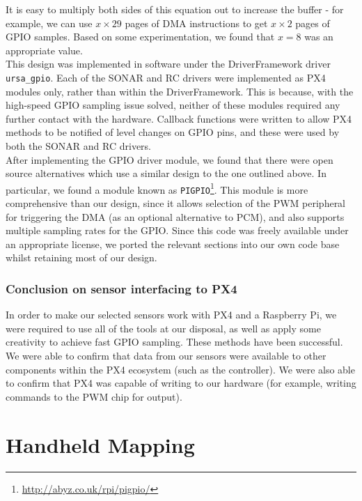 \documentclass[capstone_report.tex]{subfiles}
\begin{document}
    It is easy to multiply both sides of this equation out to increase the buffer - for example, we can use $x \times 29$ pages of DMA instructions to get $x \times 2$ pages of GPIO samples. Based on some experimentation, we found that $x=8$ was an appropriate value.\\

    This design was implemented in software under the DriverFramework driver \texttt{ursa\_gpio}. Each of the SONAR and RC drivers were implemented as PX4 modules only, rather than within the DriverFramework. This is because, with the high-speed GPIO sampling issue solved, neither of these modules required any further contact with the hardware. Callback functions were written to allow PX4 methods to be notified of level changes on GPIO pins, and these were used by both the SONAR and RC drivers. \\

    After implementing the GPIO driver module, we found that there were open source alternatives which use a similar design to the one outlined above. In particular, we found a module known as \texttt{PIGPIO}\footnote{\url{http://abyz.co.uk/rpi/pigpio/}}. This module is more comprehensive than our design, since it allows selection of the PWM peripheral for triggering the DMA (as an optional alternative to PCM), and also supports multiple sampling rates for the GPIO. Since this code was freely available under an appropriate license, we ported the relevant sections into our own code base whilst retaining most of our design.

    \subsubsection{Conclusion on sensor interfacing to PX4}
    In order to make our selected sensors work with PX4 and a Raspberry Pi, we were required to use all of the tools at our disposal, as well as apply some creativity to achieve fast GPIO sampling. These methods have been successful. We were able to confirm that data from our sensors were available to other components within the PX4 ecosystem (such as the controller). We were also able to confirm that PX4 was capable of writing to our hardware (for example, writing commands to the PWM chip for output).

\section{Handheld Mapping}
\end{document}
